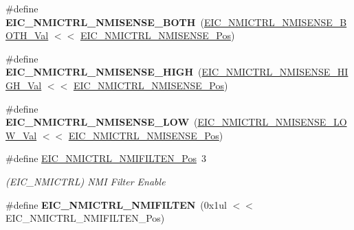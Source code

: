 \begin{DoxyCompactItemize}
\item 
\hypertarget{group___s_a_m_l21___e_i_c_gad83b3c9ea023f0c8c0c56b5a027c7ae4}{}\#define {\bfseries E\+I\+C\+\_\+\+N\+M\+I\+C\+T\+R\+L\+\_\+\+N\+M\+I\+S\+E\+N\+S\+E\+\_\+\+B\+O\+T\+H}~(\hyperlink{group___s_a_m_l21___e_i_c_ga7c987cbee9b60bfd4e68ddd11982a512}{E\+I\+C\+\_\+\+N\+M\+I\+C\+T\+R\+L\+\_\+\+N\+M\+I\+S\+E\+N\+S\+E\+\_\+\+B\+O\+T\+H\+\_\+\+Val} $<$$<$ \hyperlink{group___s_a_m_l21___e_i_c_ga48859c121f51b57ddf343ba53ff169a1}{E\+I\+C\+\_\+\+N\+M\+I\+C\+T\+R\+L\+\_\+\+N\+M\+I\+S\+E\+N\+S\+E\+\_\+\+Pos})\label{group___s_a_m_l21___e_i_c_gad83b3c9ea023f0c8c0c56b5a027c7ae4}

\item 
\hypertarget{group___s_a_m_l21___e_i_c_ga7d49f4b3ad088c21e1e248b6ead40a4d}{}\#define {\bfseries E\+I\+C\+\_\+\+N\+M\+I\+C\+T\+R\+L\+\_\+\+N\+M\+I\+S\+E\+N\+S\+E\+\_\+\+H\+I\+G\+H}~(\hyperlink{group___s_a_m_l21___e_i_c_ga30c9d119b917f1bec88af90d0c7fa180}{E\+I\+C\+\_\+\+N\+M\+I\+C\+T\+R\+L\+\_\+\+N\+M\+I\+S\+E\+N\+S\+E\+\_\+\+H\+I\+G\+H\+\_\+\+Val} $<$$<$ \hyperlink{group___s_a_m_l21___e_i_c_ga48859c121f51b57ddf343ba53ff169a1}{E\+I\+C\+\_\+\+N\+M\+I\+C\+T\+R\+L\+\_\+\+N\+M\+I\+S\+E\+N\+S\+E\+\_\+\+Pos})\label{group___s_a_m_l21___e_i_c_ga7d49f4b3ad088c21e1e248b6ead40a4d}

\item 
\hypertarget{group___s_a_m_l21___e_i_c_gaee7719cf601b054085fc6d588052ed3c}{}\#define {\bfseries E\+I\+C\+\_\+\+N\+M\+I\+C\+T\+R\+L\+\_\+\+N\+M\+I\+S\+E\+N\+S\+E\+\_\+\+L\+O\+W}~(\hyperlink{group___s_a_m_l21___e_i_c_gaa3b9af8d6d835716ec282a17a72f7052}{E\+I\+C\+\_\+\+N\+M\+I\+C\+T\+R\+L\+\_\+\+N\+M\+I\+S\+E\+N\+S\+E\+\_\+\+L\+O\+W\+\_\+\+Val}  $<$$<$ \hyperlink{group___s_a_m_l21___e_i_c_ga48859c121f51b57ddf343ba53ff169a1}{E\+I\+C\+\_\+\+N\+M\+I\+C\+T\+R\+L\+\_\+\+N\+M\+I\+S\+E\+N\+S\+E\+\_\+\+Pos})\label{group___s_a_m_l21___e_i_c_gaee7719cf601b054085fc6d588052ed3c}

\item 
\hypertarget{group___s_a_m_l21___e_i_c_ga38d9267b17841862f6a70ce455f52da0}{}\#define \hyperlink{group___s_a_m_l21___e_i_c_ga38d9267b17841862f6a70ce455f52da0}{E\+I\+C\+\_\+\+N\+M\+I\+C\+T\+R\+L\+\_\+\+N\+M\+I\+F\+I\+L\+T\+E\+N\+\_\+\+Pos}~3\label{group___s_a_m_l21___e_i_c_ga38d9267b17841862f6a70ce455f52da0}

\begin{DoxyCompactList}\small\item\em (E\+I\+C\+\_\+\+N\+M\+I\+C\+T\+R\+L) N\+M\+I Filter Enable \end{DoxyCompactList}\item 
\hypertarget{group___s_a_m_l21___e_i_c_gac4f421180e2c30aabb16780b60d5d145}{}\#define {\bfseries E\+I\+C\+\_\+\+N\+M\+I\+C\+T\+R\+L\+\_\+\+N\+M\+I\+F\+I\+L\+T\+E\+N}~(0x1ul $<$$<$ E\+I\+C\+\_\+\+N\+M\+I\+C\+T\+R\+L\+\_\+\+N\+M\+I\+F\+I\+L\+T\+E\+N\+\_\+\+Pos)\label{group___s_a_m_l21___e_i_c_gac4f421180e2c30aabb16780b60d5d145}


\end{DoxyCompactItemize}
